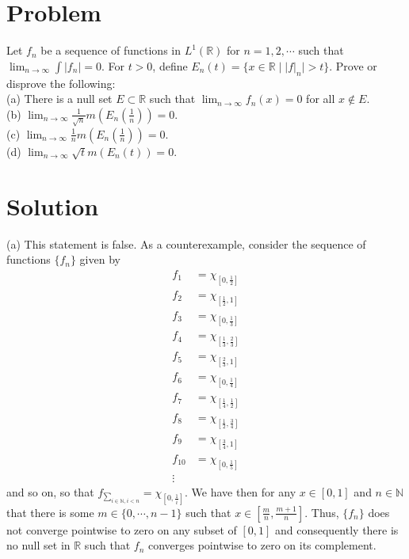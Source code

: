 \documentclass{article}
\begin{document}
\section*{Problem}
Let $f_n$ be a sequence of functions in $L^1(\mathbb{R})$ for $n=1,2,\cdots$ such that $\lim_{n\rightarrow\infty}\int|f_n|=0$.  For $t>0$, define $E_n(t)=\{x\in\mathbb{R}\mid|f|_n|>t\}$.  Prove or disprove the following:\\

\noindent (a) There is a null set $E\subset\mathbb{R}$ such that $\lim_{n\rightarrow\infty}f_n(x)=0$ for all $x\not\in E$.\\

\noindent (b) $\lim_{n\rightarrow\infty}\frac{1}{\sqrt{n}}m(E_n(\frac{1}{n}))=0$.\\

\noindent (c) $\lim_{n\rightarrow\infty}\frac{1}{n}m(E_n(\frac{1}{n}))=0$.\\

\noindent (d) $\lim_{n\rightarrow\infty}\sqrt{t}m(E_n(t))=0$.\\

\section*{Solution}
(a) This statement is false.  As a counterexample, consider the sequence of functions $\{f_n\}$ given by
\begin{align*}
f_1&=\chi_{[0,\frac{1}{2}]}\\
f_2&=\chi_{[\frac{1}{2},1]}\\
f_3&=\chi_{[0,\frac{1}{3}]}\\
f_4&=\chi_{[\frac{1}{3},\frac{2}{3}]}\\
f_5&=\chi_{[\frac{2}{3},1]}\\
f_6&=\chi_{[0,\frac{1}{4}]}\\
f_7&=\chi_{[\frac{1}{4},\frac{1}{2}]}\\
f_8&=\chi_{[\frac{1}{2},\frac{3}{4}]}\\
f_9&=\chi_{[\frac{3}{4},1]}\\
f_{10}&=\chi_{[0,\frac{1}{5}]}\\
\vdots
\end{align*}
and so on, so that $f_{\sum_{i\in\mathbb{N},i< n}}=\chi_{[0,\frac{1}{i}]}$.  We have then for any $x\in[0,1]$ and $n\in\mathbb{N}$ that there is some $m\in\{0,\cdots,n-1\}$ such that $x\in[\frac{m}{n},\frac{m+1}{n}]$.  Thus, $\{f_n\}$ does not converge pointwise to zero on any subset of $[0,1]$ and consequently there is no null set in $\mathbb{R}$ such that $f_n$ converges pointwise to zero on its complement.\\
\end{document}
